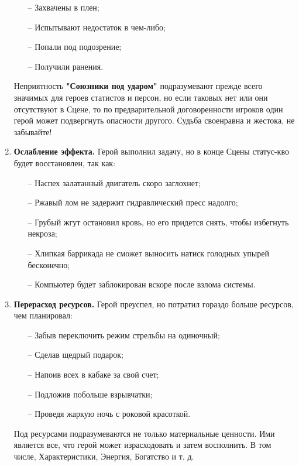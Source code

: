 \begin{enumerate}
\begin{itemize}
    \item[--] Захвачены в плен;
    \item[--] Испытывают недостаток в чем-либо;
    \item[--] Попали под подозрение;
    \item[--] Получили ранения.
\end{itemize}
\begin{tcolorbox}
    Неприятность \textbf{"Союзники под ударом"} подразумевают прежде всего значимых для героев статистов и персон, но если таковых нет или они отсутствуют в Сцене, то по предварительной договоренности игроков один герой может подвергнуть опасности другого. Судьба своенравна и жестока, не забывайте!
\end{tcolorbox}

\item \textbf{Ослабление эффекта.} Герой выполнил задачу, но в конце Сцены статус-кво будет восстановлен, так как:
\begin{itemize}
    \item[--] Наспех залатанный двигатель скоро заглохнет;
    \item[--] Ржавый лом не задержит гидравлический пресс надолго;
    \item[--] Грубый жгут остановил кровь, но его придется снять, чтобы избегнуть некроза;
    \item[--] Хлипкая баррикада не сможет выносить натиск голодных упырей бесконечно;
    \item[--] Компьютер будет заблокирован вскоре после взлома системы.
\end{itemize}

\item \textbf{Перерасход ресурсов.} Герой преуспел, но потратил гораздо больше ресурсов, чем планировал:
\begin{itemize}
    \item[--] Забыв переключить режим стрельбы на одиночный;
    \item[--] Сделав щедрый подарок;
    \item[--] Напоив всех в кабаке за свой счет;
    \item[--] Подложив побольше взрывчатки;
    \item[--] Проведя жаркую ночь с роковой красоткой.
\end{itemize}

\begin{tcolorbox}
    Под ресурсами подразумеваются не только материальные ценности. Ими является все, что герой может израсходовать и затем восполнить. В том числе, Характеристики, Энергия, Богатство и т. д.
\end{tcolorbox}


\end{enumerate}
